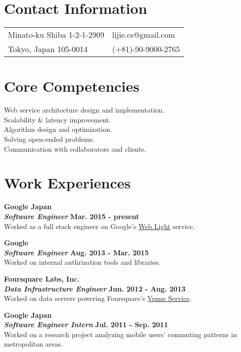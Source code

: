 \documentclass[margin,line]{res}
\begin{document}

\begin{resume}
\section{\sc Contact Information}
\vspace{.05in}
\begin{tabular}{@{}p{3in}p{4in}}
Minato-ku Shiba 1-2-1-2909 & lijie.cs@gmail.com \\
Tokyo, Japan 105-0014 & (+81)-90-9000-2765 \\
\end{tabular}

\section{\sc Core Competencies}
Web service architecture design and implementation.\\
Scalability \& latency improvement.\\
Algorithm design and optimization.\\
Solving open-ended problems.\\
Communication with collaborators and clients.

\section{\sc Work Experiences}
{\bf{Google Japan}}\\
{\bf{\em Software Engineer}} \hfill {\bf Mar. 2015 - present}\\
Worked as a full stack engineer on Google's \href{https://support.google.com/webmasters/answer/6211428?hl=en}{Web Light} service.

{\bf{Google}}\\
{\bf{\em Software Engineer}} \hfill {\bf Aug. 2013 - Mar. 2015}\\
Worked on internal authrization tools and libraries.

{\bf{Foursquare Labs, Inc.}}\\
{\bf{\em Data Infrastructure Engineer}} \hfill {\bf Jun. 2012 - Aug. 2013}\\
Worked on data servers powering Foursquare's \href{https://foursquare.com/dev/overview/venues}{Venue Service}.

{\bf{Google Japan}}\\
{\bf{\em Software Engineer Intern}} \hfill {\bf Jul. 2011 - Sep. 2011}\\
Worked on a research project analyzing mobile users' commuting patterns in metropolitan areas.


\end{resume}
\end{document}
